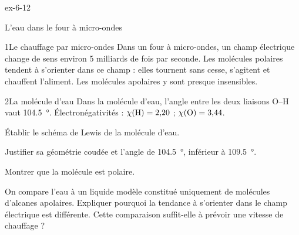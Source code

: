 \begin{blocLivre}{ex-6-12}
\begin{exercice}[3]{L'eau dans le four à micro-ondes}
\begin{docu}{1}{Le chauffage par micro-ondes}
Dans un four à micro-ondes, un champ électrique change de sens environ 5 milliards de fois par seconde. Les molécules
polaires tendent à s'orienter dans ce champ : elles tournent sans cesse, s'agitent et chauffent l'aliment. Les molécules
apolaires y sont presque insensibles.
\end{docu}
\begin{docu}{2}{La molécule d'eau}
Dans la molécule d'eau, l'angle entre les deux liaisons O--H vaut \qty{104,5}{\degree}. Électronégativités : $\chi(\ce{H})=2{,}20$ ;
$\chi(\ce{O})=3{,}44$.
\end{docu}
\begin{questions}
\item Établir le schéma de Lewis de la molécule d'eau.
\item Justifier sa géométrie coudée et l'angle de \qty{104,5}{\degree}, inférieur à \qty{109,5}{\degree}.
\item Montrer que la molécule est polaire.
\item \initiative On compare l'eau à un liquide modèle constitué uniquement de molécules d'alcanes apolaires. Expliquer pourquoi
la tendance à s'orienter dans le champ électrique est différente. Cette comparaison suffit-elle à prévoir une vitesse de chauffage ?
\end{questions}
\end{exercice}
\end{blocLivre}
